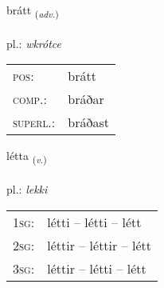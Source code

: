 \documentclass[frontgrid, backgrid]{flacards}\usepackage[]{graphicx}\usepackage[]{xcolor}
\begin{document}
\renewcommand{\flhead}{\vskip5pt \fboxsep=0pt {\small\bfseries\footnotesize Atviksorð | przysłówek}}
\renewcommand{\fcfoot}{\vskip5pt \fboxsep=0pt \hspace{2pt}{\small\bfseries\footnotesize 3K}}

\renewcommand{\blhead}{\vskip5pt {\small\bfseries\footnotesize Atviksorð | przysłówek }}
\renewcommand{\bcfoot}{\vskip5pt \hspace{2pt}{\small\bfseries\footnotesize 3K}}


{brátt \small{\textsubscript{(\textit{adv.})}} \\[1ex] %
\textphonetic{[prauht]} \\
pl.: \emph{wkrótce} \\  [2ex]
\renewcommand*{\arraystretch}{0.8}
\begin{tabular}{ll}
\textsc{pos}: & brátt \\ 
\textsc{comp.}: & bráðar \\ 
\textsc{superl.}: & bráðast \\
\end{tabular}
}

\renewcommand{\flhead}{\vskip5pt \fboxsep=0pt {\small\bfseries\footnotesize Sagnorð | czasownik}}
\renewcommand{\fcfoot}{\vskip5pt \fboxsep=0pt \hspace{2pt}{\small\bfseries\footnotesize 3K}}

\renewcommand{\blhead}{\vskip5pt {\small\bfseries\footnotesize Sagnorð | czasownik }}
\renewcommand{\bcfoot}{\vskip5pt \hspace{2pt}{\small\bfseries\footnotesize 3K}}


{létta \small{\textsubscript{(\textit{v.})}} \\[1ex] %
\textphonetic{[ljɛhta]} \\
pl.: \emph{lekki} \\  [2ex]
\renewcommand*{\arraystretch}{0.8}
\begin{tabular}{p{1cm}l}
\textsc{1sg}: & létti -- létti -- létt \\ 
\textsc{2sg}: & léttir -- léttir -- létt \\ 
\textsc{3sg}: & léttir -- létti -- létt \\ 
\end{tabular}
}
\end{document}
